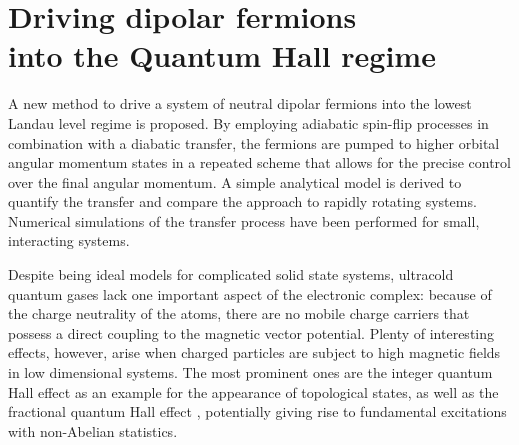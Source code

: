 
\newcommand{\Ef}{E_\text{F}}
\newcommand{\up}{\uparrow}
\newcommand{\down}{\downarrow}
\newcommand{\liqhe}{L^{\star}}
\newcommand{\dl}[1]{{\hat #1}}
\newcommand{\dlCdd}{\dl{C}_\text{dd}}
\newcommand{\dlEf}{\dl{E}_\text{F}}
\newcommand{\dlliqhe}{\dl{L}^{\star}}
\newcommand{\Vdd}{\ensuremath{V_\text{dd}}\xspace}
\newcommand{\Cdd}{\ensuremath{C_\text{dd}}\xspace}

\chapter[Driving dipolar fermions into the Quantum Hall regime]{Driving dipolar fermions\texorpdfstring{\\}{ }into the Quantum Hall regime}


A new method to drive a system of neutral dipolar fermions into the lowest Landau level regime is proposed.
By employing adiabatic spin-flip processes in combination with a diabatic transfer, the fermions are pumped to higher orbital angular momentum states in a repeated scheme that allows for the precise control over the final angular momentum.
A simple analytical model is derived to quantify the transfer and compare the approach to rapidly rotating systems.
Numerical simulations of the transfer process have been performed for small, interacting systems.


Despite being ideal models for complicated solid state systems, ultracold quantum gases lack one important aspect of the electronic complex: because of the charge neutrality of the atoms, there are no mobile charge carriers that possess a direct coupling to the magnetic vector potential. Plenty of interesting effects, however, arise when charged particles are subject to high magnetic fields in low dimensional systems. The most prominent ones are the integer quantum Hall effect \cite{Klitzing1980} as an example for the appearance of topological states, as well as the fractional quantum Hall effect \cite{Laughlin1983}, potentially giving rise to fundamental excitations with non-Abelian statistics.

